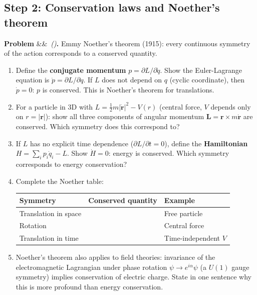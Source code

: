 \documentclass[12pt,a4paper]{article}
\newcounter{problem}
\newenvironment{problem}[1][]{\refstepcounter{problem}\par\vspace{6pt}\noindent\textbf{\color{MidBlue}Problem \theproblem}\ifx&#1&\else\ \textit{(#1)}\fi\textbf{.}\enskip}{\par\vspace{4pt}}
\begin{document}
\subsection{Step 2: Conservation laws and Noether's theorem}

\begin{problem}
\label{prob:noether}
Emmy Noether's theorem (1915): every continuous symmetry of the action corresponds to a conserved quantity.
\begin{enumerate}[label=(\alph*),topsep=2pt]
  \item Define the \textbf{conjugate momentum} $p = \partial L/\partial\dot q$. Show the Euler-Lagrange equation is $\dot p = \partial L/\partial q$. If $L$ does not depend on $q$ (cyclic coordinate), then $\dot p = 0$: $p$ is conserved. This is Noether's theorem for translations.
  \item For a particle in 3D with $L = \frac{1}{2}m|\dot{\mathbf{r}}|^2 - V(r)$ (central force, $V$ depends only on $r=|\mathbf{r}|$): show all three components of angular momentum $\mathbf{L} = \mathbf{r}\times m\dot{\mathbf{r}}$ are conserved. Which symmetry does this correspond to?
  \item If $L$ has no explicit time dependence ($\partial L/\partial t=0$), define the \textbf{Hamiltonian} $H = \sum_i p_i\dot q_i - L$. Show $\dot H = 0$: energy is conserved. Which symmetry corresponds to energy conservation?
  \item Complete the Noether table:
  \begin{center}
  \begin{tabular}{lll}
  \toprule
  \textbf{Symmetry} & \textbf{Conserved quantity} & \textbf{Example} \\
  \midrule
  Translation in space & & Free particle \\
  Rotation & & Central force \\
  Translation in time & & Time-independent $V$ \\
  \bottomrule
  \end{tabular}
  \end{center}
  \item Noether's theorem also applies to field theories: invariance of the electromagnetic Lagrangian under phase rotation $\psi\to e^{i\alpha}\psi$ (a $U(1)$ gauge symmetry) implies conservation of electric charge. State in one sentence why this is more profound than energy conservation.
\end{enumerate}
\end{problem}
\end{document}
